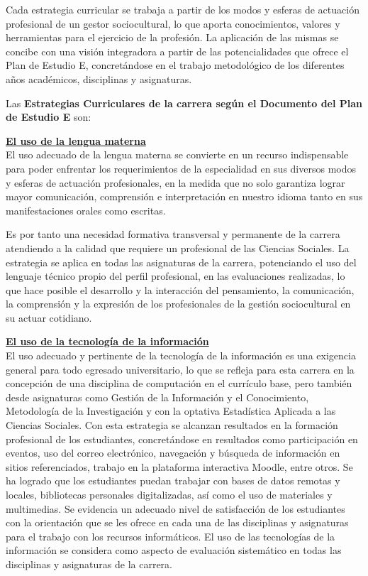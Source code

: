 Cada estrategia curricular se trabaja a partir de los modos y esferas de actuación profesional de un gestor sociocultural, lo que aporta conocimientos, valores y herramientas para el ejercicio de la profesión. La aplicación de las mismas se concibe con una visión integradora a partir de las potencialidades que ofrece el Plan de Estudio E, concretándose en el trabajo metodológico de los diferentes años académicos, disciplinas y asignaturas.

Las \textbf{Estrategias Curriculares de la carrera según el Documento del Plan de Estudio E} son:



\underline{\textbf{El uso de la lengua materna}}\\
El uso adecuado de la lengua materna se convierte en un recurso indispensable para poder enfrentar los requerimientos de la especialidad en sus diversos modos y esferas de actuación profesionales, en la medida que no solo garantiza lograr mayor comunicación, comprensión e interpretación en nuestro idioma tanto en sus manifestaciones orales como escritas.

Es por tanto una necesidad formativa transversal y permanente de la carrera atendiendo a la calidad que requiere un profesional de las Ciencias Sociales. La estrategia se aplica en todas las asignaturas de la carrera, potenciando el uso del lenguaje técnico propio del perfil profesional, en las evaluaciones realizadas, lo que hace posible el desarrollo y la interacción del pensamiento, la comunicación, la comprensión y la expresión de los profesionales de la gestión sociocultural en su actuar cotidiano.

\underline{\textbf{El uso de la tecnología de la información}}\\
El uso adecuado y pertinente de la tecnología de la información es una exigencia general para todo egresado universitario, lo que se refleja para esta carrera en la concepción de una disciplina de computación en el currículo base, pero también desde asignaturas como Gestión de la Información y el Conocimiento, Metodología de la Investigación y con la optativa Estadística Aplicada a las Ciencias Sociales. Con esta estrategia se alcanzan resultados en la formación profesional de los estudiantes, concretándose en resultados como participación en eventos, uso del correo electrónico, navegación y búsqueda de información en sitios referenciados, trabajo en la plataforma interactiva Moodle, entre otros. Se ha logrado que los estudiantes puedan trabajar con bases de datos remotas y locales, bibliotecas personales digitalizadas, así como el uso de materiales y multimedias.  Se evidencia un adecuado nivel de satisfacción de los estudiantes con la orientación que se les ofrece en cada una de las disciplinas y asignaturas para el trabajo con los recursos informáticos. El uso de las tecnologías de la información se considera como aspecto de evaluación sistemático en todas las disciplinas y asignaturas de la carrera.

